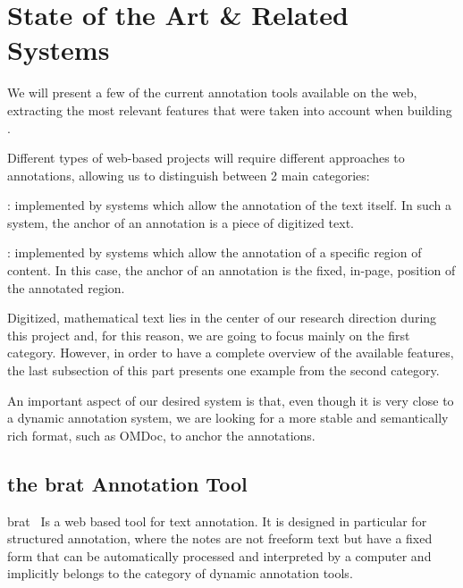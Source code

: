 \section{State of the Art \& Related Systems}
We will present a few of the current annotation tools available on the web, extracting the
most relevant features that were taken into account when building \KAT.

Different types of web-based projects will require different approaches to annotations,
allowing us to distinguish between 2 main categories:
\begin{compactenum}
\item {}: implemented by systems which allow the annotation of
  the text itself. In such a system, the anchor of an annotation is a piece of digitized
  text.
\item {}: implemented by systems which allow the annotation of a
  specific region of content. In this case, the anchor of an annotation is the fixed,
  in-page, position of the annotated region.
\end{compactenum}
Digitized, mathematical text lies in the center of our research direction during this
project and, for this reason, we are going to focus mainly on the first category. However,
in order to have a complete overview of the available features, the last subsection of
this part presents one example from the second category.

An important aspect of our desired system is that, even though it is very close to a
dynamic annotation system, we are looking for a more stable and semantically rich format,
such as \textsf{OMDoc}, to anchor the annotations.

\subsection{the brat Annotation Tool}

brat~\cite{brat:on} Is a web based tool for text annotation. It is designed in particular
for structured annotation, where the notes are not freeform text but have a fixed form
that can be automatically processed and interpreted by a computer and implicitly belongs
to the category of dynamic annotation tools.


